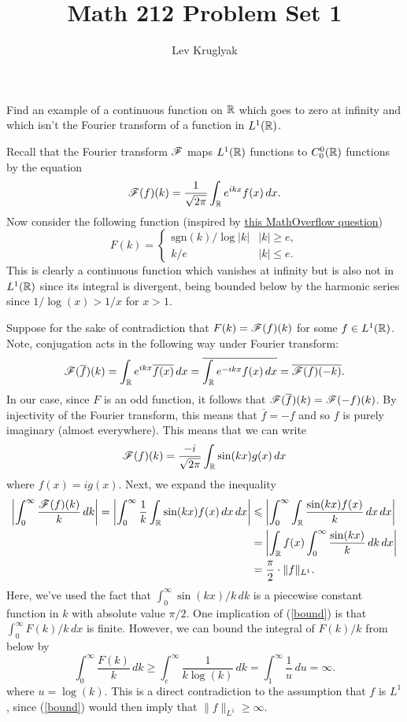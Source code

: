 \documentclass{lkx_pset}
\title{Math 212 Problem Set 1}
\author{Lev Kruglyak}
\begin{document}
\maketitle

\begin{problem}{1}
Find an example of a continuous function on $\mathbb{R}$ which goes to zero at infinity and which isn't the Fourier transform of a function in $L^1(\mathbb{R})$.
\end{problem}
\begin{solution}
	Recall that the Fourier transform $\mathscr{F}$ maps $L^1(\mathbb{R})$ functions to $C^0_0(\mathbb{R})$ functions by the equation
	\[
		\mathscr{F}(f)(k) = \frac{1}{\sqrt{2\pi}}\int_{\mathbb{R}} e^{ikx}f(x)\,dx.
	\]
	Now consider the following function (inspired by \href{https://math.stackexchange.com/questions/2265958/fourier-inverse-transform-in-c-0}{this MathOverflow question})
	\[
		F(k) = \begin{cases}\textrm{sgn}(k)/\log|k| & |k|\geq e,\\ k/e & |k|\leq e.\end{cases}
	\]
	This is clearly a continuous function which vanishes at infinity but is also not in $L^1(\mathbb{R})$ since its integral is divergent, being bounded below by the harmonic series since $1/\log(x) > 1/x$ for $x>1$.

	Suppose for the sake of contradiction that $F(k)=\mathscr{F}(f)(k)$ for some $f\in L^1(\mathbb{R})$. Note, conjugation acts in the following way under Fourier transform:
	\[
		\mathscr{F}(\overline{f})(k) = \int_{\mathbb{R}} e^{ikx}\overline{f(x)}\,dx = \overline{\int_{\mathbb{R}} e^{-ikx}f(x)\,dx}= \overline{\mathscr{F}(f)(-k)}.
	\]
	In our case, since $F$ is an odd function, it follows that $\mathscr{F}(\overline{f})(k)=\mathscr{F}(-f)(k)$. By injectivity of the Fourier transform, this means that $\overline{f}=-f$ and so $f$ is purely imaginary (almost everywhere). This means that we can write
	\[
		\mathscr{F}(f)(k) = \frac{-i}{\sqrt{2\pi}}\int_{\mathbb{R}} \sin(kx)g(x)\,dx
	\]
	where $f(x)=ig(x)$. Next, we expand the inequality
	\begin{equation}\label{bound}
		\begin{aligned}
			\left|\int_0^\infty \frac{\mathscr{F}(f)(k)}{k}\,dk\right| = \left|\int_0^\infty \frac{1}{k}\int_{\mathbb{R}} \sin(kx)f(x)\,dx\,dx\right|
			 & \leqslant \left|\int_0^\infty\int_{\mathbb{R}} \frac{\sin(kx)f(x)}{k}\,dx\,dx\right| \\
			 & =\left|\int_{\mathbb{R}} f(x)\int_0^\infty \frac{\sin(kx)}{k}\,dk\,dx\right|    \\
			 & =\frac{\pi}{2}\cdot\|f\|_{L^1}.
		\end{aligned}
	\end{equation}
	Here, we've used the fact that $\int_0^\infty \sin(kx)/k\,dk$ is a piecewise constant function in $k$ with absolute value $\pi/2$. One implication of (\ref{bound}) is that $\int_0^\infty F(k)/k\,dx$ is finite. However, we can bound the integral of $F(k)/k$ from below by
	\[
		\int_0^\infty \frac{F(k)}{k}\,dk \geq \int_e^\infty \frac{1}{k\log(k)}\,dk =\int_1^\infty\frac{1}{u}\,du=\infty.
	\]
	where $u=\log(k)$. This is a direct contradiction to the assumption that $f$ is $L^1$, since (\ref{bound}) would then imply that $\|f\|_{L^1}\geq \infty$.
\end{solution}
\end{document}
